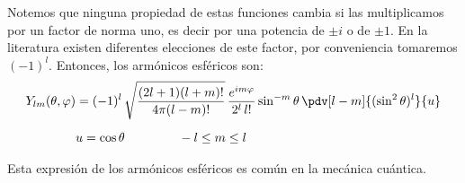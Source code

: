 Notemos que ninguna propiedad de estas funciones cambia si las multiplicamos por un factor de norma uno, es decir por una potencia de $\pm i$ o de $\pm 1$. En la literatura existen diferentes elecciones de este factor, por conveniencia tomaremos $(-1)^{l}$. Entonces, los armónicos esféricos son:
\begin{align}
\begin{aligned}
Y_{lm} (\theta, \varphi) &= (-1)^{l} \, \sqrt{\dfrac{(2 l + 1)(l + m)!}{4 \pi (l -m)!}} \, \dfrac{e^{i m \varphi}}{2^{l} \, l!} \sin^{-m} \theta \, \pdv[l-m]{(\sin^{2} \theta)^{l}}{u} \\[0.5em]
&u = \cos \theta \hspace{1.5cm} -l \leq m \leq l
\end{aligned}
\label{eq:ecuacion_10_175}
\end{align}

Esta expresión de los armónicos esféricos es común en la mecánica cuántica.



